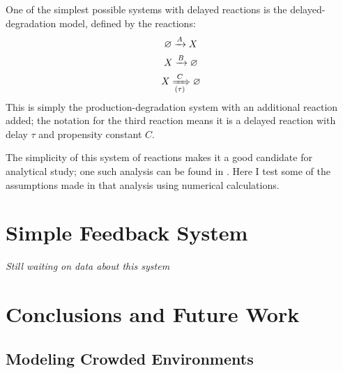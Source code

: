 \documentclass[english,letterpaper,12pt]{article}
\begin{document}
\begin{doublespacing}
One of the simplest possible systems with delayed reactions is the delayed-degradation model, defined by the reactions:
\begin{align}
    \begin{gathered}
        \varnothing \xrightarrow{A} X \\
        X \xrightarrow {B} \varnothing \\
        X \xRightarrow[(\tau)]{C} \varnothing
    \end{gathered}
    \label{eq:delayed-deg-rxns}
\end{align}
This is simply the production-degradation system with an additional reaction added; the notation for the third reaction means it is a delayed reaction with delay $\tau$ and propensity constant $C$.

The simplicity of this system of reactions makes it a good candidate for analytical study; one such analysis can be found in \cite{delay-oscillations}. Here I test some of the assumptions made in that analysis using numerical calculations.


\section{Simple Feedback System} %
\label{sec:experimental-system}

\textit{Still waiting on data about this system}


\section{Conclusions and Future Work} %
\label{sec:conclusions}

\subsection{Modeling Crowded Environments} %
\label{sub:diffusion-crowded}




\end{doublespacing}

\appendix



\end{document}
